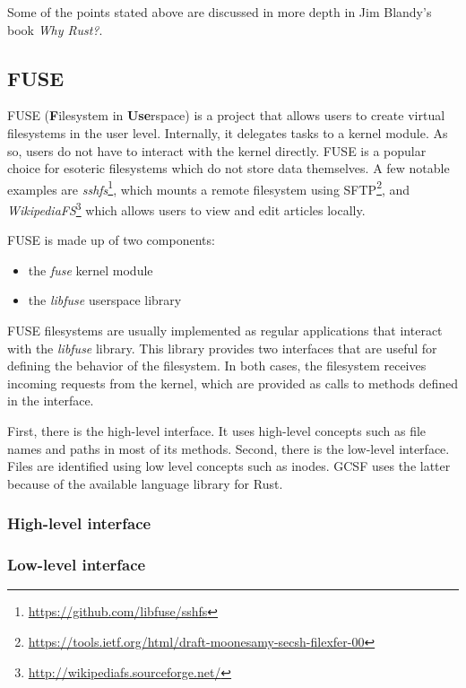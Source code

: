 Some of the points stated above are discussed in more depth in Jim Blandy's book \emph{Why Rust?}\cite{why_rust}.

\subsection{FUSE}

FUSE (\textbf{F}ilesystem in \textbf{Use}rspace) is a project that allows users to create virtual filesystems in the user level. Internally, it delegates tasks to a kernel module. As so, users do not have to interact with the kernel directly. FUSE is a popular choice for esoteric filesystems which do not store data themselves. A few notable examples are \emph{sshfs}\footnote{\url{https://github.com/libfuse/sshfs}}, which mounts a remote filesystem using SFTP\footnote{\url{https://tools.ietf.org/html/draft-moonesamy-secsh-filexfer-00}}, and \emph{WikipediaFS}\footnote{\url{http://wikipediafs.sourceforge.net/}} which allows users to view and edit articles locally.

FUSE is made up of two components:
\begin{itemize}
  \item the \textit{fuse} kernel module
  \item the \textit{libfuse} userspace library
\end{itemize}

FUSE filesystems are usually implemented as regular applications that interact with the \textit{libfuse} library. This library provides two interfaces that are useful for defining the behavior of the filesystem. In both cases, the filesystem receives incoming requests from the kernel, which are provided as calls to methods defined in the interface.

First, there is the high-level interface. It uses high-level concepts such as file names and paths in most of its methods. Second, there is the low-level interface. Files are identified using low level concepts such as inodes\cite{tanenbaum}. GCSF uses the latter because of the available language library for Rust.

\subsubsection{High-level interface}



\subsubsection{Low-level interface}


